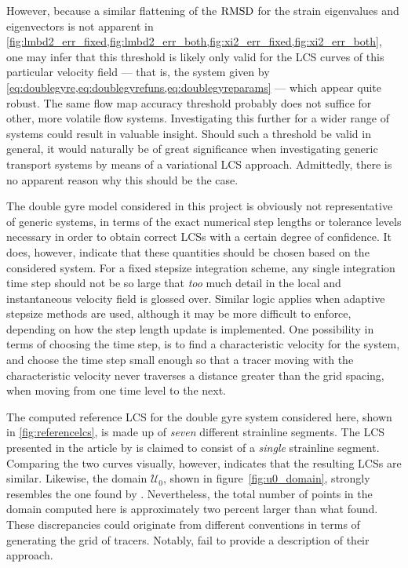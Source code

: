 However, because a similar flattening of the $\operatorname{RMSD}$ for the strain eigenvalues
and eigenvectors is not apparent in
\cref{fig:lmbd2_err_fixed,fig:lmbd2_err_both,fig:xi2_err_fixed,fig:xi2_err_both},
one may infer that this threshold is likely only valid for the LCS curves
of this particular velocity field --- that is, the system given by
\cref{eq:doublegyre,eq:doublegyrefuns,eq:doublegyreparams} %
--- which
appear quite robust. The same flow map accuracy threshold probably does not
suffice for other, more volatile flow systems. Investigating
this further for a wider range of systems could result in valuable insight.
Should such a threshold be valid in general, it would naturally be of great
significance when investigating generic transport systems by means of a
variational LCS approach. Admittedly, there is no apparent reason why
this should be the case.

The double gyre model considered in this project is obviously not representative
of generic systems, in terms of the exact numerical step lengths or tolerance
levels necessary in order to obtain correct LCSs with a certain
degree of confidence. It does, however, indicate that these quantities should
be chosen based on the considered system. For a fixed stepsize integration
scheme, any single integration time step should not be so large that \emph{too}
much detail in the local and instantaneous velocity field is glossed over.
Similar logic applies when adaptive stepsize methods are used, although it
may be more difficult to enforce, depending on how the step length
update is implemented. One possibility in terms of choosing the time step, is to
find a characteristic velocity for the system, and choose the time step small
enough so that a tracer moving with the characteristic velocity never traverses
a distance greater than the grid spacing, when moving from one time level to
the next.

The computed reference LCS for the double gyre system considered here, shown in
\cref{fig:referencelcs}, is made up of \emph{seven} different strainline
segments. The LCS presented in the article by \textcite{farazmand2012computing}
is claimed to consist of a \emph{single} strainline segment. Comparing the two
curves visually, however, indicates that the resulting LCSs are similar.
Likewise, the domain $\mathcal{U}_{0}$, shown in figure~\ref{fig:u0_domain},
strongly resembles the one found by \citeauthor{farazmand2012computing}.
Nevertheless, the total number of points in the domain computed here is
approximately two percent larger than what \citeauthor{farazmand2012computing}
found. These discrepancies could originate from different conventions in terms
of generating the grid of tracers. Notably, \citeauthor{farazmand2012computing}
fail to provide a description of their approach.

